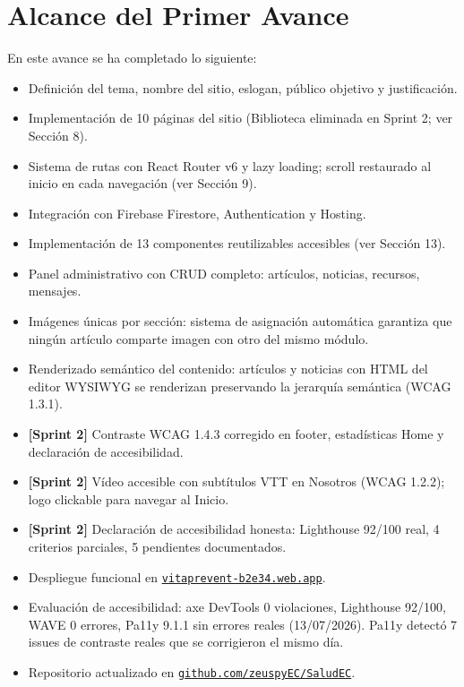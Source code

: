 \documentclass[12pt, a4paper]{article}
\begin{document}
\section{Alcance del Primer Avance}

En este avance se ha completado lo siguiente:

\begin{itemize}
  \item Definición del tema, nombre del sitio, eslogan, público objetivo y justificación.
  \item Implementación de 10 páginas del sitio (Biblioteca eliminada en Sprint 2; ver Sección 8).
  \item Sistema de rutas con React Router v6 y lazy loading; scroll restaurado al inicio en cada navegación (ver Sección 9).
  \item Integración con Firebase Firestore, Authentication y Hosting.
  \item Implementación de 13 componentes reutilizables accesibles (ver Sección 13).
  \item Panel administrativo con CRUD completo: artículos, noticias, recursos, mensajes.
  \item Imágenes únicas por sección: sistema de asignación automática garantiza que ningún artículo comparte imagen con otro del mismo módulo.
  \item Renderizado semántico del contenido: artículos y noticias con HTML del editor WYSIWYG se renderizan preservando la jerarquía semántica (WCAG 1.3.1).
  \item \textbf{[Sprint 2]} Contraste WCAG 1.4.3 corregido en footer, estadísticas Home y declaración de accesibilidad.
  \item \textbf{[Sprint 2]} Vídeo accesible con subtítulos VTT en Nosotros (WCAG 1.2.2); logo clickable para navegar al Inicio.
  \item \textbf{[Sprint 2]} Declaración de accesibilidad honesta: Lighthouse 92/100 real, 4 criterios parciales, 5 pendientes documentados.
  \item Despliegue funcional en \href{https://vitaprevent-b2e34.web.app}{\texttt{vitaprevent-b2e34.web.app}}.
  \item Evaluación de accesibilidad: axe DevTools 0 violaciones, Lighthouse 92/100, WAVE 0 errores, Pa11y 9.1.1 sin errores reales (13/07/2026). Pa11y detectó 7 issues de contraste reales que se corrigieron el mismo día.
  \item Repositorio actualizado en \href{https://github.com/zeuspyEC/SaludEC}{\texttt{github.com/zeuspyEC/SaludEC}}.
\end{itemize}
\end{document}
